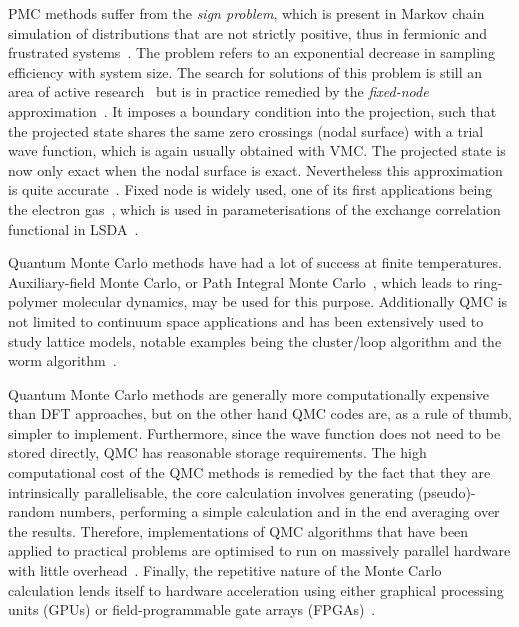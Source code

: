 PMC methods suffer from the \emph{sign problem}, which is present in Markov chain simulation of distributions that are not strictly positive, thus in fermionic and frustrated systems~\cite{gubernatis_kawashima_werner_2016}. The problem refers to an exponential decrease in sampling efficiency with system size. The search for solutions of this problem is still an area of active research~\cite{foulkes2001quantum} but is in practice remedied by the \emph{fixed-node} approximation~\cite{anderson1975random}. It imposes a boundary condition into the projection, such that the projected state shares the same zero crossings (nodal surface) with a trial wave function, which is again usually obtained with VMC. The projected state is now only exact when the nodal surface is exact. Nevertheless this approximation is quite accurate~\cite{foulkes2001quantum}. Fixed node is widely used, one of its first applications being the electron gas~\cite{ceperley1980ground}, which is used in parameterisations of the  exchange correlation functional in LSDA~\cite{vosko1980accurate}.

Quantum Monte Carlo methods have had a lot of success at finite temperatures. Auxiliary-field Monte Carlo, or Path Integral Monte Carlo~\cite{ceperley1995path}, which leads to ring-polymer molecular dynamics, may be used for this purpose. Additionally QMC is not limited to continuum space applications and has been extensively used to study lattice models, notable examples being the cluster/loop algorithm and the worm algorithm~\cite{gubernatis_kawashima_werner_2016, prokof1998exact}.

Quantum Monte Carlo methods are generally more computationally expensive than DFT approaches, but on the other hand QMC codes are, as a rule of thumb, simpler to implement. Furthermore, since the wave function does not need to be stored directly, QMC has reasonable storage requirements. The high computational cost of the QMC methods is remedied by the fact that they are intrinsically parallelisable, the core calculation involves generating (pseudo)-random numbers, performing a simple calculation and in the end averaging over the results. Therefore, implementations of QMC algorithms that have been applied to practical problems are optimised to run on massively parallel hardware with little overhead~\cite{needs2020variational}. Finally, the repetitive nature of the Monte Carlo calculation lends itself to hardware acceleration using either graphical processing units (GPUs) or field-programmable gate arrays (FPGAs)~\cite{austin2012quantum}.

